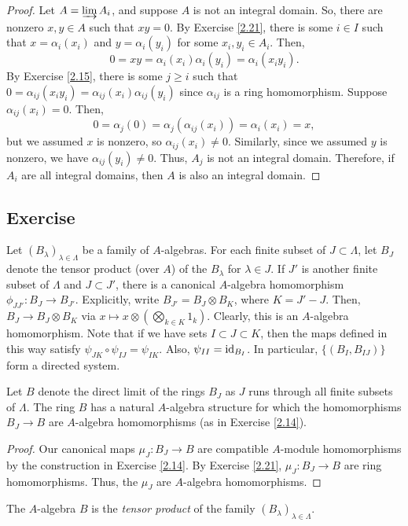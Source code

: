 \begin{proof}
Let $A = \varinjlim A_i$, and suppose $A$ is not an integral domain. So, there are nonzero $x,y \in A$ such that $xy = 0$. By Exercise \ref{2.21}, there is some $i \in I$ such that
$x = \alpha_i(x_i)$ and $y = \alpha_i(y_i)$ for some $x_i,y_i \in A_i$. Then, 
$$0 = xy = \alpha_i(x_i)\alpha_i(y_i) = \alpha_i(x_iy_i).$$
By Exercise \ref{2.15}, there is some $j \ge i$ such that $0 = \alpha_{ij}(x_iy_i) = \alpha_{ij}(x_i)\alpha_{ij}(y_i)$ since $\alpha_{ij}$ is a ring homomorphism. Suppose $\alpha_{ij}(x_i) = 0$. Then,
$$0 = \alpha_j(0) = \alpha_j(\alpha_{ij}(x_i)) = \alpha_i(x_i) = x,$$
but we assumed $x$ is nonzero, so $\alpha_{ij}(x_i) \neq 0$. Similarly, since we assumed $y$ is nonzero, we have $\alpha_{ij}(y_i) \neq 0$. Thus, $A_j$ is not an integral domain. 
Therefore, if $A_i$ are all integral domains, then $A$ is also an integral domain.
\end{proof}

\subsection{Exercise}\label{2.23} %

Let $(B_{\lambda})_{\lambda \in \Lambda}$ be a family of $A$-algebras. For each finite subset of $J \subset \Lambda$, let $B_J$ denote the tensor product (over $A$) of the $B_{\lambda}$ for
$\lambda \in J$. If $J'$ is another finite subset of $\Lambda$ and $J \subset J'$, there is a canonical $A$-algebra homomorphism $\phi_{JJ'} : B_J \to B_{J'}$. Explicitly, write $B_{J'} = B_J \otimes B_K$,
where $K = J' - J$. Then, $B_J \to B_J \otimes B_K$ via $x \mapsto x \otimes \left(\bigotimes_{k \in K}1_k\right)$. Clearly, this is an $A$-algebra homomorphism. 
Note that if we have sets $I \subset J \subset K$, then the maps defined in this way satisfy $\psi_{JK}\circ\psi_{IJ} = \psi_{IK}$. Also, $\psi_{II} = \operatorname{id}_{B_I}$. In particular, $\{(B_I, B_{IJ})\}$ form a directed system.

Let $B$ denote the direct limit of the rings $B_J$ as $J$ runs through all finite subsets of $\Lambda$. The ring $B$ has a natural $A$-algebra structure for which the homomorphisms 
$B_J \to B$ are $A$-algebra homomorphisms (as in Exercise \ref{2.14}). 
\begin{proof}
Our canonical maps $\mu_J : B_J \to B$ are compatible $A$-module homomorphisms by the construction in Exercise \ref{2.14}. By Exercise \ref{2.21}, $\mu_J : B_J \to B$ are ring homomorphisms. Thus,
the $\mu_J$ are $A$-algebra homomorphisms.
\end{proof}
The $A$-algebra $B$ is the {\it tensor product} of the family $(B_{\lambda})_{\lambda \in \Lambda}$.

